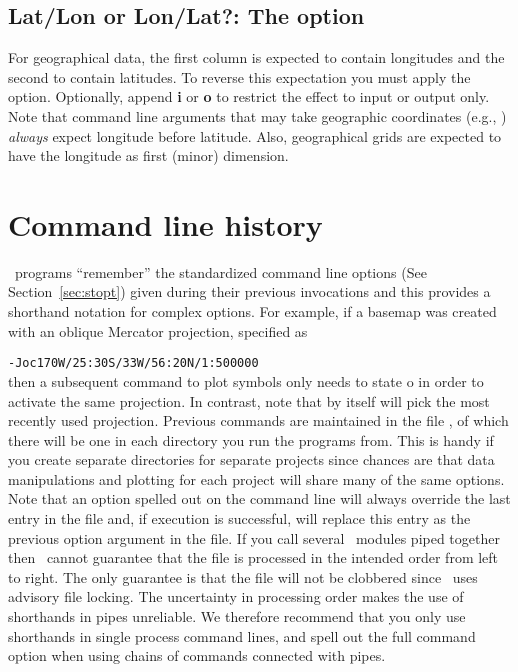 \subsection{Lat/Lon or Lon/Lat?: The \Opt{:} option}

For geographical data, the first column is expected to contain longitudes
and the second to contain latitudes.  To reverse this expectation you must
apply the \Opt{:} option.  Optionally, append \textbf{i} or \textbf{o} to restrict
the effect to input or output only.  Note that command line arguments that may take
geographic coordinates (e.g., ) \emph{always} expect longitude before
latitude. Also, geographical grids are expected to have the longitude as
first (minor) dimension.

%

\section{Command line history}
\label{sec:gmtcommands}

\GMT\ programs ``remember'' the standardized command line options
(See Section~\ref{sec:stopt}) given during their previous invocations
and this provides a shorthand notation for complex options.
For example, if a basemap was created with an oblique Mercator
projection, specified as

\vspace{\baselineskip} 

\texttt{-Joc170W/25:30S/33W/56:20N/1:500000} \\ 

\vspace{\baselineskip} 
\noindent
then a subsequent  command to plot symbols only needs
to state o in order to activate the same projection.  In
contrast, note that  by itself will pick the most recently used projection.
Previous commands are maintained in the file ,
of which there will be one in each directory you run the programs
from.  This is handy if you create separate directories for
separate projects since chances are that data manipulations
and plotting for each project will share many of the same options.
Note that an option spelled out on the command line will always
override the last entry in the  file and,
if execution is successful, will replace this entry as the
previous option argument in the  file.
If you call several \GMT\ modules piped together then \GMT\ cannot
guarantee that the  file is processed
in the intended order from left to right.  The only guarantee
is that the file will not be clobbered since \GMT\ uses advisory
file locking.  The uncertainty in processing order makes the use
of shorthands in pipes unreliable.  We therefore recommend that you
only use shorthands in single process command lines, and spell out
the full command option when using chains of commands connected with
pipes.

